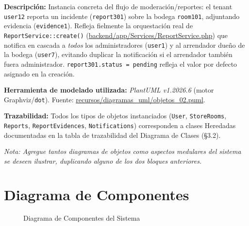 \noindent\textbf{Descripción:} Instancia concreta del flujo de moderación/reportes: el tenant \texttt{user12} reporta un incidente (\texttt{report301}) sobre la bodega \texttt{room101}, adjuntando evidencia (\texttt{evidence1}). Refleja fielmente la orquestación real de \texttt{ReportService::create()} (\url{backend/app/Services/ReportService.php}) que notifica en cascada a \emph{todos} los administradores (\texttt{user1}) y al arrendador dueño de la bodega (\texttt{user7}), evitando duplicar la notificación si el arrendador también fuera administrador. \texttt{report301.status = pending} refleja el valor por defecto asignado en la creación.

\bigskip
\noindent\textbf{Herramienta de modelado utilizada:} \textit{PlantUML v1.2026.6} (motor Graphviz/\texttt{dot}). Fuente: \url{recursos/diagramas_uml/objetos_02.puml}.

\bigskip
\noindent\textbf{Trazabilidad:} Todos los tipos de objetos instanciados (\texttt{User}, \texttt{StoreRooms}, \texttt{Reports}, \texttt{ReportEvidences}, \texttt{Notifications}) corresponden a clases Heredadas documentadas en la tabla de trazabilidad del Diagrama de Clases (\S3.2).

\bigskip
\noindent\textit{Nota: Agregue tantos diagramas de objetos como aspectos medulares del sistema se deseen ilustrar, duplicando alguno de los dos bloques anteriores.}
\clearpage
\clearpage

\section{Diagrama de Componentes}

\begin{figure}[H]
    \centering
    \caption{Diagrama de Componentes del Sistema}
    \label{fig:componentes}
\end{figure}

